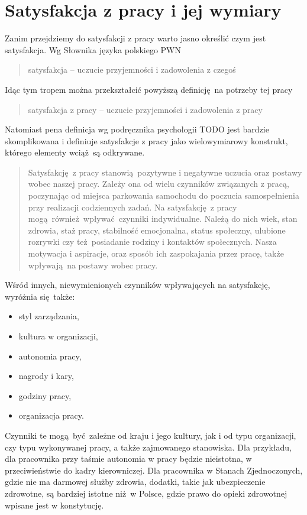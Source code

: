 \section{Satysfakcja z pracy i jej wymiary}
Zanim przejdziemy do satysfakcji z pracy warto jasno określić czym jest satysfakcja. Wg Słownika języka polskiego PWN
\begin{quote}
satysfakcja -- uczucie przyjemności i zadowolenia z czegoś
\end{quote}
Idąc tym tropem można przekształcić powyższą definicję na potrzeby tej pracy
\begin{quote}
satysfakcja z pracy -- uczucie przyjemności i zadowolenia z pracy
\end{quote}

Natomiast pena definicja wg podręcznika psychologii TODO jest bardzie skomplikowana i definiuje satysfakcje z pracy jako wielowymiarowy konstrukt, którego elementy wciąż są odkrywane.

\begin{quotation}
Satysfakcję z pracy stanowią pozytywne i negatywne uczucia oraz postawy wobec naszej pracy. Zależy ona od wielu czynników związanych z pracą, poczynając od miejsca parkowania samochodu do poczucia samospełnienia przy realizacji codziennych zadań. Na satysfakcję z pracy mogą również wpływać czynniki indywidualne. Należą do nich wiek, stan zdrowia, staż pracy, stabilność emocjonalna, status społeczny, ulubione rozrywki czy też posiadanie rodziny i kontaktów społecznych. Nasza motywacja i
aspiracje, oraz sposób ich zaspokajania przez pracę, także wpływają na postawy wobec pracy.
\end{quotation}
Wśród innych, niewymienionych czynników wpływających na satysfakcję, wyróżnia się także:
\begin{itemize}
\item styl zarządzania,
\item kultura w organizacji,
\item autonomia pracy,
\item nagrody i kary,
\item godziny pracy,
\item organizacja pracy.
\end{itemize}
Czynniki te mogą być zależne od kraju i jego kultury, jak i od typu organizacji, czy typu wykonywanej pracy, a także zajmowanego stanowiska. Dla przykładu, dla pracownika przy taśmie autonomia w pracy będzie nieistotna, w przeciwieństwie do kadry kierowniczej. Dla pracownika w Stanach Zjednoczonych, gdzie nie ma darmowej służby zdrowia, dodatki, takie jak ubezpieczenie zdrowotne, są bardziej istotne niż w Polsce, gdzie prawo do opieki zdrowotnej wpisane jest w konstytucję. 

